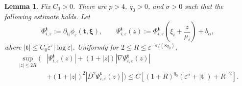\documentclass[11pt]{article}
\newtheorem{lemma}[theorem]{Lemma}
\numberwithin{equation}{section}
\begin{document}
\begin{lemma}\label{lem:expanding-core-scale}
Fix $C_0>0$. There are $p>4$, $q_0>0$, and $\sigma>0$ such that the
following estimate holds. Let
\[
\Phi_{i,\varepsilon}^{\boldsymbol t}
:=\partial_{t_i}\phi_\varepsilon(\boldsymbol t,\boldsymbol\xi),
\qquad
\Psi_{i,\varepsilon}^{\boldsymbol t}(z)
:=\Phi_{i,\varepsilon}^{\boldsymbol t}
\left(\xi_i+\frac z{\mu_i}\right)+b_\alpha,
\]
where $|\boldsymbol t|\leq C_0\varepsilon^\tau
|\log\varepsilon|$. Uniformly for
$2\leq R\leq\varepsilon^{-\sigma/(8q_0)}$,
\begin{equation}\label{eq:expanding-core-estimate}
\begin{aligned}
\sup_{|z|\leq2R}\Big(&|\Psi_{i,\varepsilon}^{\boldsymbol t}(z)|
+(1+|z|)|\nabla\Psi_{i,\varepsilon}^{\boldsymbol t}(z)|\\
&+(1+|z|)^2|D^2\Psi_{i,\varepsilon}^{\boldsymbol t}(z)|\Big)
\leq C\left[(1+R)^{q_0}
(\varepsilon^\sigma+|\boldsymbol t|)+R^{-2}\right].
\end{aligned}
\end{equation}
\end{lemma}
\end{document}
